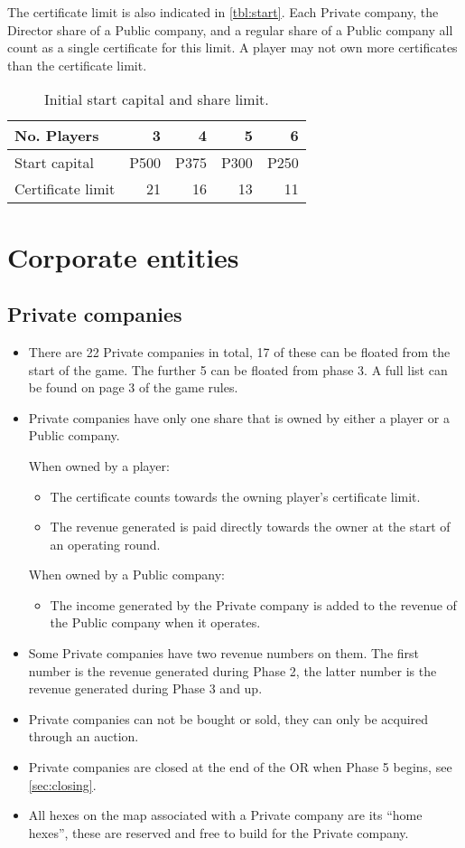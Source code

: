 \documentclass[a4paper,twocolumn]{article}
\begin{document}
The certificate limit is also indicated in \autoref{tbl:start}. Each Private
company, the Director share of a Public company, and a regular share of a Public
company all count as a single certificate for this limit. A player may not own
more certificates than the certificate limit.

\begin{table}
	\centering
	\caption{Initial start capital and share limit.}
	\label{tbl:start}
	\begin{tabular}{l|r|r|r|r}
	No. Players & 3 & 4 & 5 & 6 \\ \hline
	Start capital & P500 & P375 & P300 & P250 \\
	Certificate limit & 21 & 16 & 13 & 11 \\
	\end{tabular}
\end{table}

\section{Corporate entities}
\subsection{Private companies}
\begin{itemize}
	\item There are 22 Private companies in total, 17 of these can be floated
	from the start of the game. The further 5 can be floated from phase 3. A
	full list can be found on page 3 of the game rules.
	\item Private companies have only one share that is owned by either a player
	or a Public company.
	
	When owned by a player:
	\begin{itemize}
		\item The certificate counts towards the owning player's certificate
		limit.
		\item The revenue generated is paid directly towards the owner at the
		start of an operating round.
	\end{itemize}
	When owned by a Public company:
	\begin{itemize}
		\item The income generated by the Private company is added to the
		revenue of the Public company when it operates.
	\end{itemize}
	
	\item Some Private companies have two revenue numbers on them. The first
	number is the revenue generated during Phase 2, the latter number is the
	revenue generated during Phase 3 and up.
	\item Private companies can not be bought or sold, they can only be acquired
	through an auction.
	\item Private companies are closed at the end of the OR when Phase 5 begins,
	see \autoref{sec:closing}.
	\item All hexes on the map associated with a Private company are its ``home
	hexes'', these are reserved and free to build for the Private company.
\end{itemize}
\end{document}
